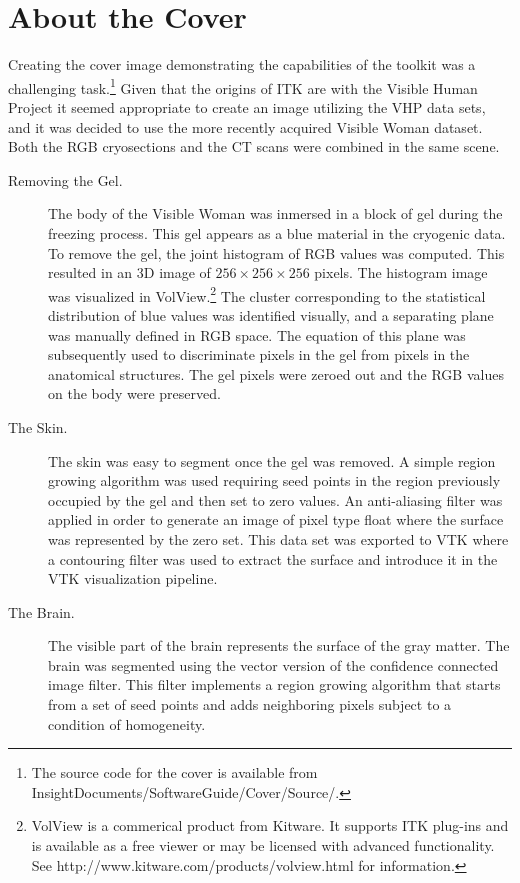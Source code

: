 \small

\chapter*{About the Cover}

Creating the cover image demonstrating the capabilities of the toolkit was a
challenging task.\footnote{The source code for the cover is available from
InsightDocuments/SoftwareGuide/Cover/Source/.} Given that the origins of ITK
are with the Visible Human Project it seemed appropriate to create an image
utilizing the VHP data sets, and it was decided to use the more recently
acquired Visible Woman dataset.  Both the RGB cryosections and the CT scans
were combined in the same scene.

\begin{description}

\item [Removing the Gel.]
The body of the Visible Woman was inmersed in a block of gel during the
freezing process. This gel appears as a blue material in the cryogenic data.
To remove the gel, the joint histogram of RGB values was computed. This
resulted in an 3D image of $256\times256\times256$ pixels. The histogram
image was visualized in VolView.\footnote{VolView is a commerical product
from Kitware. It supports ITK plug-ins and is available as a free viewer or
may be licensed with advanced functionality. See
http://www.kitware.com/products/volview.html for information.} The cluster
corresponding to the statistical distribution of blue values was identified
visually, and a separating plane was manually defined in RGB space. The
equation of this plane was subsequently used to discriminate pixels in the
gel from pixels in the anatomical structures. The gel pixels were zeroed out
and the RGB values on the body were preserved.

\item[The Skin.]
The skin was easy to segment once the gel was removed. A simple region
growing algorithm was used requiring seed points in the region previously
occupied by the gel and then set to zero values. An anti-aliasing filter was
applied in order to generate an image of pixel type float where the surface
was represented by the zero set. This data set was exported to VTK where a
contouring filter was used to extract the surface and introduce it in the VTK
visualization pipeline.

\item[The Brain.]
The visible part of the brain represents the surface of the gray matter.  The
brain was segmented using the vector version of the confidence connected
image filter.  This filter implements a region growing algorithm that starts
from a set of seed points and adds neighboring pixels subject to a condition
of homogeneity.


\end{description}
